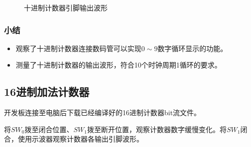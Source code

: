 \documentclass[UTF8]{ctexart}
\numberwithin{figure}{subsection}
\numberwithin{table}{subsection}
\numberwithin{equation}{subsection}
\begin{document}
\begin{figure}[H]
    \centering

    
    \caption{十进制计数器引脚输出波形}
    \label{10counter_fast}
\end{figure}

\subsubsection{小结}
\begin{itemize}
    \item 观察了十进制计数器连接数码管可以实现\(0 \sim 9\)数字循环显示的功能。
    \item 测量了十进制计数器的输出波形，符合10个时钟周期1循环的要求。
\end{itemize}

\subsection{16进制加法计数器}
开发板连接至电脑后下载已经编译好的16进制计数器bit流文件。
\par 将\(SW_0\)拨至闭合位置、\(SW_1\)拨至断开位置，观察计数器数字缓慢变化。将\(SW_1\)闭合，使用示波器观察计数器各输出引脚波形。
\end{document}
